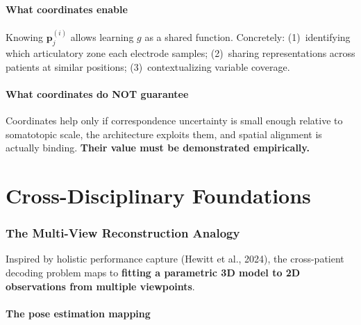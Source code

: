 \documentclass[11pt,letterpaper]{article}
\newcommand{\bfp}{\mathbf{p}}
\begin{document}
\subsection{What coordinates enable}

Knowing $\bfp_j^{(i)}$ allows learning $g$ as a shared function. Concretely: (1)~identifying which articulatory zone each electrode samples; (2)~sharing representations across patients at similar positions; (3)~contextualizing variable coverage.

\subsection{What coordinates do NOT guarantee}

Coordinates help only if correspondence uncertainty is small enough relative to somatotopic scale, the architecture exploits them, and spatial alignment is actually binding. \textbf{Their value must be demonstrated empirically.}



\part{Cross-Disciplinary Foundations}

\section{The Multi-View Reconstruction Analogy}\label{sec:analogy}

Inspired by holistic performance capture (Hewitt et al., 2024), the cross-patient decoding problem maps to \textbf{fitting a parametric 3D model to 2D observations from multiple viewpoints}.

\subsection{The pose estimation mapping}
\end{document}
